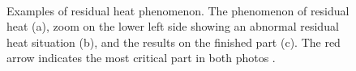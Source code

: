 \begin{figure}
    \centering
    \\
    \quad
    \caption[Residual heat.]{Examples of residual heat phenomenon. The phenomenon of residual heat (a), zoom on the lower left side showing an abnormal residual heat situation (b), and the results on the finished part (c). The red arrow indicates the most critical part in both photos \cite{boone_thermal_2018}.}
\end{figure}

